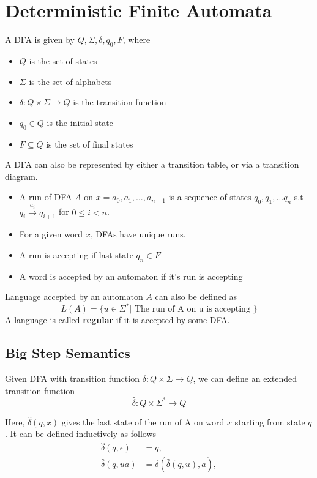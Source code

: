 \documentclass{report}
\begin{document}
\section{Deterministic Finite Automata}

A DFA is given by $Q,\Sigma,\delta,q_0,F$, where
\begin{itemize}
  \item $Q$ is the set of states
  \item $\Sigma$ is the set of alphabets
  \item $\delta: Q \times \Sigma \rightarrow Q$ is the transition function
  \item $q_0 \in Q$ is the initial state
  \item $F \subseteq Q$ is the set of final states
\end{itemize}

A DFA can also be represented by either a transition table, or via a transition diagram.

\begin{itemize}
  \item A run of DFA $A$ on $x = a_0,a_1,...,a_{n-1}$ is a sequence of states $q_0,q_1,...q_n$ s.t $q_i \overset{a_i}{\rightarrow} q_{i+1}$ for $0 \leq i < n$.
  \item For a given word $x$, DFAs have unique runs.
  \item A run is accepting if last state $q_n \in F$
  \item A word is accepted by an automaton if it's run is accepting
\end{itemize}

Language accepted by an automaton $A$ can also be defined as
$$
  L(A) = \{ u \in \Sigma^* | \text{ The run of A on u is accepting } \}
$$
A language is called \textbf{regular} if it is accepted by some DFA.

\subsection{Big Step Semantics}

Given DFA with transition function $\delta: Q \times \Sigma \rightarrow Q$, we can define an extended transition function
$$
  \hat{\delta}: Q \times \Sigma^* \rightarrow Q
$$

Here, $\hat{\delta}(q,x)$ gives the last state of the run of A on word $x$ starting from state $q$. It can be defined inductively as follows
\begin{align*}
  \hat{\delta}(q,\epsilon) & = q,                           \\
  \hat{\delta}(q,ua)       & = \delta(\hat{\delta}(q,u),a), \\
\end{align*}
\end{document}
